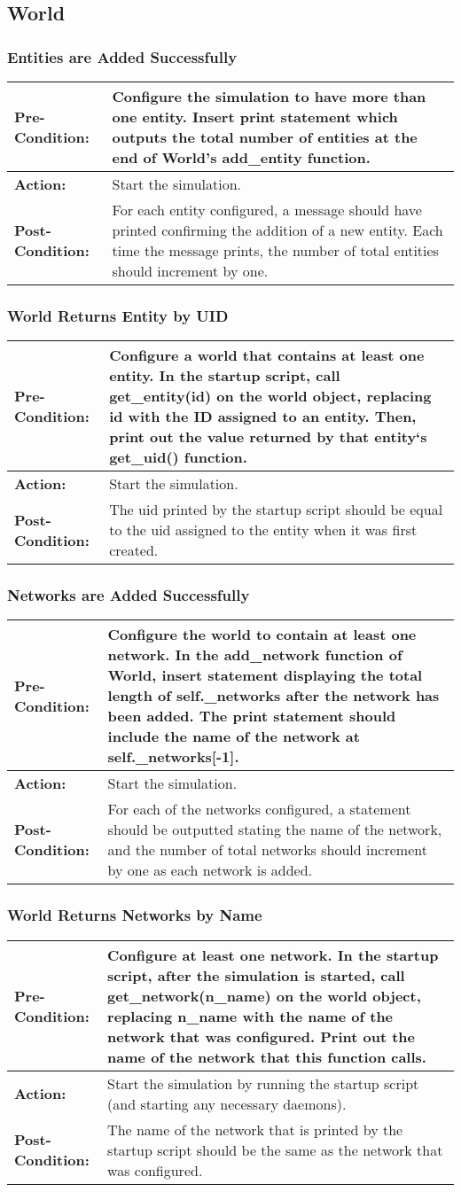 \documentclass[titlepage]{article}
\newcommand{\testcase}[3]{
    \begin{center}
    \begin{tabular}{| l | p{0.7\textwidth}|}
        \hline
        \rowcolor[gray]{0.8}\textbf{Pre-Condition:} & #1 \\ \hline
        \textbf{Action:} & #2 \\ \hline
        \rowcolor[gray]{0.8}\textbf{Post-Condition:} & #3 \\ \hline
    \end{tabular}
    \end{center}
}
\begin{document}
\subsection{World}
\subsubsection{Entities are Added Successfully}
\testcase{Configure the simulation to have more than one entity.  Insert print statement which outputs the total number
of entities at the end of World's add\_entity function.}{Start the simulation.}{For each entity configured, a message should have printed confirming the addition of a new entity.  Each time the message prints, the number of total entities should increment by one.}

\subsubsection{World Returns Entity by UID}
\testcase{Configure a world that contains at least one entity. In the startup script, call get\_entity(id) on the world
object, replacing id with the ID assigned to an entity. Then, print out the value returned by that entity`s  get\_uid() function.}{Start the simulation.}{The uid printed by the startup script should be equal to the uid assigned to the entity when it was first created.}

\subsubsection{Networks are Added Successfully}
\testcase{Configure the world to contain at least one network.  In the add\_network function of World, insert statement
displaying the total length of self.\_networks after the network has been added. The print statement should include the
name of the network at self.\_networks[-1].}{Start the simulation.}{For each of the networks configured, a statement should be outputted stating the name of the network, and the number of total networks should increment by one as each network is added.}

\subsubsection{World Returns Networks by Name}
\testcase{Configure at least one network.  In the startup script, after the simulation is started, call
get\_network(n\_name) on the world object, replacing n\_name with the name of the network that was configured.  Print out the name of the network that this function calls.}{Start the simulation by running the startup script (and starting any necessary daemons).}{The name of the network that is printed by the startup script should be the same as the network that was configured.}
\end{document}
